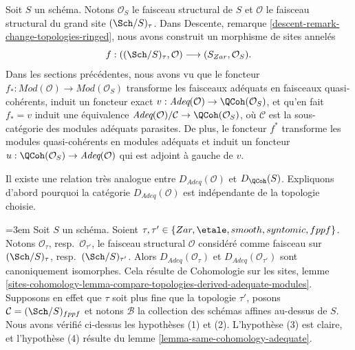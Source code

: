 \noindent
Soit $S$ un schéma. Notons $\mathcal{O}_S$ le faisceau structural de $S$
et $\mathcal{O}$ le faisceau structural du grand site $(\Sch/S)_\tau$.
Dans
Descente, remarque \ref{descent-remark-change-topologies-ringed},
nous avons construit un morphisme de sites annelés
\begin{equation}
\label{equation-compare-big-small}
f :
((\Sch/S)_\tau, \mathcal{O})
\longrightarrow
(S_{Zar}, \mathcal{O}_S).
\end{equation}
Dans les sections précédentes, nous avons vu que le foncteur
$f_* : \textit{Mod}(\mathcal{O}) \to \textit{Mod}(\mathcal{O}_S)$
transforme les faisceaux adéquats en faisceaux quasi-cohérents,
induit un foncteur exact
$v : \textit{Adeq}(\mathcal{O}) \to \QCoh(\mathcal{O}_S)$, et
qu'en fait $f_* = v$ induit une équivalence
$\textit{Adeq}(\mathcal{O})/\mathcal{C} \to \QCoh(\mathcal{O}_S)$,
où $\mathcal{C}$ est la sous-catégorie des modules adéquats parasites.
De plus, le foncteur $f^*$ transforme les modules quasi-cohérents
en modules adéquats et induit un foncteur
$u : \QCoh(\mathcal{O}_S) \to \textit{Adeq}(\mathcal{O})$
qui est adjoint à gauche de $v$.

\medskip\noindent
Il existe une relation très analogue entre
$D_{\textit{Adeq}}(\mathcal{O})$ et $D_\QCoh(S)$.
Expliquons d'abord pourquoi la catégorie $D_{\textit{Adeq}}(\mathcal{O})$
est indépendante de la topologie choisie.

\begin{remark}
\label{remark-D-adeq-independence-topology}
{\emergencystretch=3em
Soit $S$ un schéma.
Soient $\tau, \tau' \in \{Zar,\allowbreak \etale,\allowbreak smooth,\allowbreak syntomic,\allowbreak fppf\}$.
Notons $\mathcal{O}_\tau$, resp.\ $\mathcal{O}_{\tau'}$,
le faisceau structural $\mathcal{O}$ considéré comme faisceau sur
$(\Sch/S)_\tau$, resp.\ $(\Sch/S)_{\tau'}$.
Alors $D_{\textit{Adeq}}(\mathcal{O}_\tau)$ et
$D_{\textit{Adeq}}(\mathcal{O}_{\tau'})$ sont canoniquement isomorphes.
Cela résulte de Cohomologie sur les sites, lemme
\ref{sites-cohomology-lemma-compare-topologies-derived-adequate-modules}.
Supposons en effet que $\tau$ soit plus fine que la topologie $\tau'$, posons
$\mathcal{C} = (\Sch/S)_{fppf}$ et notons $\mathcal{B}$ la collection
des schémas affines au-dessus de $S$. Nous avons vérifié ci-dessus les hypothèses (1) et (2).
L'hypothèse (3) est claire, et l'hypothèse (4) résulte du
lemme \ref{lemma-same-cohomology-adequate}.\par}
\end{remark}


